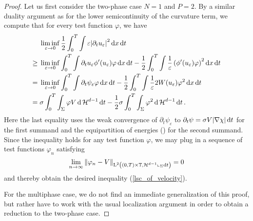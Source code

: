 \begin{proof}
	Let us first consider the two-phase case $ N = 1 $ and $ P = 2 $. By a 
	similar duality argument as for the 
	lower semicontinuity of the curvature term, we compute 
	that for 
	every test function $ \varphi $, we have
	\begin{align*}
		& \liminf_{ \varepsilon \to 0 }
			\frac{ 1 }{ 2 }
			\int_{ 0 }^{ T }
				\int
					\varepsilon \abs{ \partial_{ t } u_{ \varepsilon } }^{ 2 }
				\dd{ x }
			\dd{ t }
		\\
		\geq{} &
		\liminf_{ \varepsilon \to 0 }
			\int_{ 0 }^{ T }
				\int
					\partial_{ t } u_{ \varepsilon } 
					\phi ' ( u_{ \varepsilon } )
					\varphi
				\dd{ x }
			\dd{ t }
		-
		\frac{ 1 }{ 2 }
		\int_{ 0 }^{ T }
			\int
				\frac{ 1 }{ \varepsilon }
				\left( \phi ' ( u_{ \varepsilon } ) \varphi \right)^{ 2 }
			\dd{ x }
		\dd{ t }
		\\
		={} &
		\liminf_{ \varepsilon \to 0 }
			\int_{ 0 }^{ T }
				\int
					\partial_{ t } \psi_{ \varepsilon }
					\varphi
				\dd{ x }
			\dd{ t }
			-
			\frac{ 1 }{ 2 }
			\int_{ 0 }^{ T }
				\int
					\frac{ 1 }{ \varepsilon }
					2 W ( u_{ \varepsilon } )
					\varphi^{ 2 }
				\dd{ x }
			\dd{ t }
		\\
		={} &
		\sigma
		\int_{ 0 }^{ T }
			\int_{ \Sigma }
				\varphi V
			\dd{ \operatorname{\mathcal{H}}^{ d - 1 } }
		\dd{ t }
		-
		\frac{ 1 }{ 2 }
		\sigma
		\int_{ 0 }^{ T }
			\int_{ \Sigma }
				\varphi^{ 2 }
			\dd{ \operatorname{\mathcal{H}}^{ d - 1 } }
		\dd{ t }.
	\end{align*}
	Here the last equality uses the weak convergence of $ \partial_{  t } 
	\psi_{ \varepsilon } $ to $ \partial_{  t } \psi = \sigma V \abs{ \nabla 
	\chi } \dd{ t } $ for the first summand 
	and the equipartition of energies () for 
	the second summand.
	Since the inequality holds for any test function $ \varphi $, we may 
	plug in a sequence of test functions $ \varphi_{ n } $ satisfying
	\begin{equation*}
		\lim_{ n \to \infty }
			\norm{ \varphi_{ n } - V }_{ \operatorname{L}^{ 2 } \left( ( 0 , T ) \times 
			\operatorname{\mathbb{T}} , \operatorname{\mathcal{H}}^{ d - 1 }  \llcorner_{ \Sigma } \dd{ t } \right) }
		= 0
	\end{equation*}
	and thereby obtain the desired inequality (\ref{lsc_of_velocity}).
	
	For the multiphase case, we do not find an immediate generalization of this 
	proof, but rather have to work with the usual localization argument in 
	order to 
	obtain a reduction to the two-phase case.
	

\end{proof}
